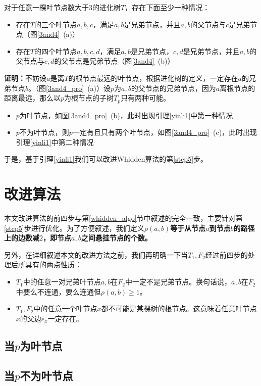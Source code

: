 \begin{yinli}\label{yinli1}
对于任意一棵叶节点数大于$3$的进化树$T$，存在下面至少一种情况：
\begin{itemize}
	\item 存在$T$的三个叶节点$a,b,c$，满足$a,b$是兄弟节点，并且$a,b$的父节点与$c$是兄弟节点（图\ref{3and4}~(a)）
	\item 存在$T$的四个叶节点$a,b,c,d$，满足$a,b$是兄弟节点，$c,d$是兄弟节点，并且$a,b$的父节点与$c,d$的父节点是兄弟节点（图\ref{3and4}~(b)）
\end{itemize}
\end{yinli}

\textbf{证明：}不妨设$a$是离$T$的根节点最远的叶节点，根据进化树的定义，一定存在$a$的兄弟节点$b$。（图\ref{3and4_pro}~(a)）设$p$为$a,b$的父节点的兄弟节点，因为$a$离根节点的距离最远，那么以$p$为根节点的子树$T_p$只有两种可能。
\begin{itemize}
	\item $p$为叶节点，如图\ref{3and4_pro}~(b)，此时出现引理\ref{yinli1}中第一种情况
	\item $p$不为叶节点，则$p$一定有且只有两个叶节点，如图\ref{3and4_pro}~(c)，此时出现引理\ref{yinli1}中第二种情况
\end{itemize}


于是，基于引理\ref{yinli1}我们可以改进Whidden算法的第\ref{step5}步。

\section{改进算法}
本文改进算法的前四步与第\ref{whidden_algo}节中叙述的完全一致，主要针对第\ref{step5}步进行优化。为了方便叙述，我们定义\textbf{$\rho(a,b)$等于从节点$a$到节点$b$的路径上的边数减$2$，即节点$a,b$之间悬挂节点的个数。}

另外，在详细叙述本文的改进方法之前，我们再明确一下当$T_1,F_2$经过前四步的处理后所具有的两点性质：
\begin{itemize}
	\item $T_1$中的任意一对兄弟叶节点$a,b$在$F_2$中一定不是兄弟节点。换句话说，$a,b$在$F_2$中要么不连通，要么连通但$\rho(a,b) \ge 1$。
	\item $T_1,F_2$中的任意一个叶节点$x$都不可能是某棵树的根节点。这意味着任意叶节点$x$的父边$e_x$一定存在。
\end{itemize}

\subsection{当$p$为叶节点}
\subsection{当$p$不为叶节点}






























